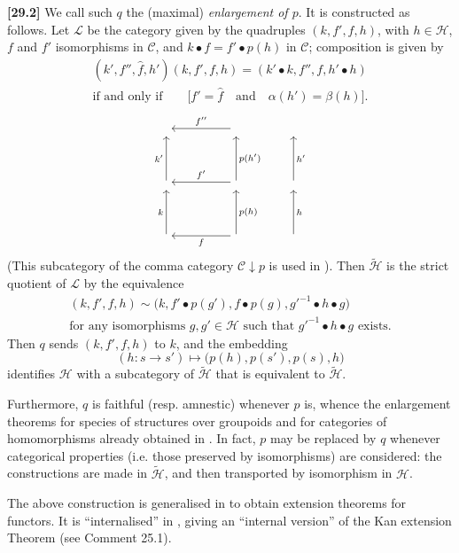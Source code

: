 \documentclass[a4paper,fleqn]{article}
\theoremstyle{plain}
\theoremstyle{definition}
\newenvironment{longcomm}[1]
  {\noindent\textbf{[#1]}\rmfamily}
  {}
\newcommand{\textand}{\quad\text{and}\quad}
\newcommand{\CC}{\mathcal{C}}
\newcommand{\HH}{\mathcal{H}}
\newcommand{\smallbullet}{\bullet}
\begin{document}
\begin{longcomm}{29.2}
  We call such $q$ the (maximal) \emph{enlargement of $p$}.
  It is constructed as follows.
  Let $\mathcal{L}$ be the category given by the quadruples $(k,f',f,h)$, with $h\in\HH$, $f$ and $f'$ isomorphisms in $\CC$, and $k\smallbullet f=f'\smallbullet p(h)$ in $\CC$; composition is given by
  \[
    \begin{gathered}
      (k',f'',\hat{f},h')(k,f',f,h)
      = (k'\smallbullet k, f'', f, h'\smallbullet h)
    \\\text{if and only if}\qquad
      \big[f'=\hat{f}
      \textand
      \alpha(h')=\beta(h)\big].
    \end{gathered}
  \]
  \[
    \begin{tikzcd}[sep=huge]
      {}
      &{} \ar[l,swap,"f''"]
    \\{} \ar[u,"k'"]
      &{} \ar[l,swap,"f'"] \ar[u,swap,"p(h')"]
    \\{} \ar[u,"k"]
      &{} \ar[l,"f"] \ar[u,swap,"p(h)"]
    \end{tikzcd}
    \qquad
    \begin{tikzcd}[sep=huge]
      {}
    \\{} \ar[u,swap,"h'"]
    \\{} \ar[u,swap,"h"]
    \end{tikzcd}
  \]
  (This subcategory of the comma category $\CC\downarrow p$ is used in \cite[Section~1]{coll100}).
  Then $\widetilde{\HH}$ is the strict quotient of $\mathcal{L}$ by the equivalence
  \[
    \begin{gathered}
      (k,f',f,h)
      \sim \big(
        k, f'\smallbullet p(g'), f\smallbullet p(g), {g'}^{-1}\smallbullet h\smallbullet g
      \big)
    \\\text{for any isomorphisms $g,g'\in\HH$ such that ${g'}^{-1}\smallbullet h\smallbullet g$ exists.}
    \end{gathered}
  \]
  Then $q$ sends $(k,f',f,h)$ to $k$, and the embedding
  \[
    (h\colon s\to s')
    \longmapsto \big(
      p(h), p(s'), p(s), h
    \big)
  \]
  identifies $\HH$ with a subcategory of $\widetilde{\HH}$ that is equivalent to $\widetilde{\HH}$.

  Furthermore, $q$ is faithful (resp. amnestic) whenever $p$ is, whence the enlargement theorems for species of structures over groupoids and for categories of homomorphisms already obtained in \cite{coll47}.
  In fact, $p$ may be replaced by $q$ whenever categorical properties (i.e. those preserved by isomorphisms) are considered: the constructions are made in $\widetilde{\HH}$, and then transported by isomorphism in $\HH$.

  The above construction is generalised in \cite{coll77,coll122} to obtain extension theorems for functors.
  It is ``internalised'' in \cite{coll89,coll90,coll95,coll96}, giving an ``internal version'' of the Kan extension Theorem (see Comment 25.1).
\end{longcomm}
\end{document}
